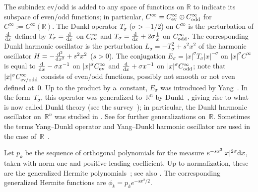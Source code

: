 \documentclass[11pt]{article}
\newcommand{\R}{\mathbb{R}}
\newcommand{\Cinf}{C^\infty}
\begin{document}
The subindex ev/odd is added to any space of functions on $\R$ to indicate its subspace of even/odd functions; in particular, $\Cinf=\Cinf_{\text{\rm ev}}\oplus\Cinf_{\text{\rm odd}}$ for $\Cinf:=\Cinf(\R)$. The Dunkl operator $T_\sigma$ ($\sigma>-1/2$) on $\Cinf$ is the perturbation of $\frac{{\rm d}}{{\rm d}x}$ def\/ined by $T_\sigma=\frac{{\rm d}}{{\rm d}x}$ on $\Cinf_{\text{\rm ev}}$ and $T_\sigma=\frac{{\rm d}}{{\rm d}x}+2\sigma\frac{1}{x}$ on $\Cinf_{\text{\rm odd}}$. The corresponding Dunkl harmonic oscillator is the perturbation $L_\sigma=-T_\sigma^2+s^2x^2$ of the harmonic oscillator $H=-\frac{{\rm d}^2}{{\rm d}x^2}+s^2x^2$ ($s>0$). The conjugation $E_\sigma=|x|^\sigma T_\sigma|x|^{-\sigma}$ on $|x|^\sigma\Cinf$ is equal to $\frac{{\rm d}}{{\rm d}x}-\sigma x^{-1}$ on $|x|^\sigma\Cinf_{\text{\rm ev}}$ and $\frac{{\rm d}}{{\rm d}x}+\sigma x^{-1}$ on $|x|^\sigma\Cinf_{\text{\rm odd}}$; note that $|x|^\sigma\Cinf_{\text{\rm ev/odd}}$ consists of even/odd functions, possibly not smooth or not even def\/ined at~$0$. Up to the product by a~constant, $E_\sigma$ was introduced by Yang~\cite{Yang1951}. In the form~$T_\sigma$, this operator was generalized to~$\R^n$ by Dunkl~\cite{Dunkl1988,Dunkl1989,Dunkl1991}, giving rise to what is now called Dunkl theory (see the survey~\cite{Rosler2003}); in particular, the Dunkl harmonic oscillator on~$\R^n$ was studied in \cite{Dunkl2002,NowakStempak2009b,NowakStempak2009a, Rosenblum1994}. See \cite{Plyushchay2000} for further generalizations on~$\R$. Sometimes the terms Yang--Dunkl operator and Yang--Dunkl harmonic oscillator are used in the case of~$\R$~\cite{Plyushchay2000}.

Let $p_k$ be the sequence of orthogonal polynomials for the measure $e^{-sx^2}|x|^{2\sigma}{\rm d}x$, taken with norm one and positive leading coef\/f\/icient. Up to normalization, these are the generalized Hermite polynomials~\cite[p.~380, Problem~25]{Szego1975}; see also \cite{Chihara1955,Chihara1978,DickinsonWarsi1963,DuttaChatterjeaMore1975,Rosenblum1994,Rosler1998}. The corresponding generalized Hermite functions are $\phi_k=p_ke^{-sx^2/2}$.
\end{document}
